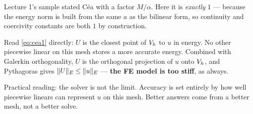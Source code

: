 \begin{intuition}
Lecture 1's sample stated C\'ea with a factor $M/\alpha$. Here it is
\emph{exactly} $1$ --- because the energy norm is built from the same $a$ as the
bilinear form, so continuity and coercivity constants are both $1$ by
construction.

Read \eqref{eq:cea1} directly: $U$ is the closest point of $V_{h}$ to $u$ in
energy. No other piecewise linear on this mesh stores a more accurate energy.
Combined with Galerkin orthogonality, $U$ is the orthogonal projection of $u$
onto $V_{h}$, and Pythagoras gives $\lVert U\rVert_{E}\le\lVert u\rVert_{E}$ ---
\textbf{the FE model is too stiff}, as always.

Practical reading: the solver is not the limit. Accuracy is set entirely by how
well piecewise linears can represent $u$ on this mesh. Better answers come from
a better mesh, not a better solve.
\end{intuition}
